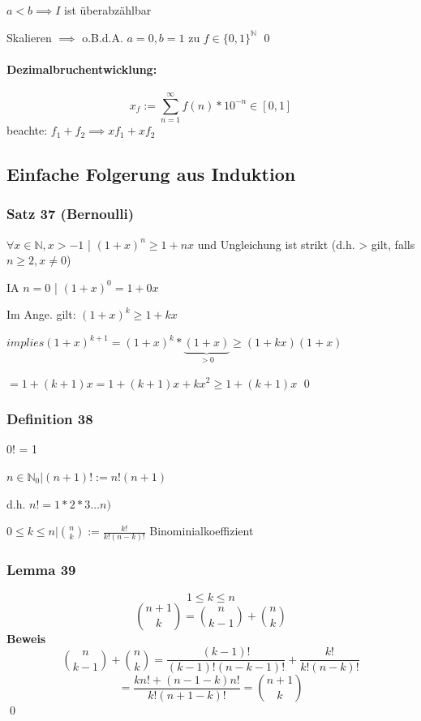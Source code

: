 \documentclass[fleqn]{scrartcl}
\renewenvironment{proof}{{\bfseries Beweis }}{\qed}
\begin{document}
$a < b \implies I$ ist überabzählbar

\begin{proof}
Skalieren $\implies$ o.B.d.A. $a = 0, b = 1$ zu $f \in \{0,1\}^\mathbb{N}$
\end{proof}
\paragraph{Dezimalbruchentwicklung:} \[x_f := \sum_{n = 1}^\infty f(n) * 10^{-n} \in [0,1]\]
beachte: $f_1 + f_2 \implies xf_1 + xf_2$
\subsection{Einfache Folgerung aus Induktion}
\subsubsection{Satz 37 (Bernoulli)}
$\forall x \in \mathbb{N}, x > -1$ | $(1+x)^n \geq 1 + nx$ und Ungleichung ist strikt (d.h. > gilt, falls $n \geq 2, x \neq 0$)

\begin{proof}
	IA $n = 0$ | $(1 + x)^0 = 1 + 0x$
	
	Im Ange. gilt: $(1 + x)^k \geq 1 + k x$
	
	$implies (1 + x)^{k + 1} = (1 + x)^k * \underbrace{(1 + x)}_{> 0} \geq (1 + kx) (1 + x)$
	
	$= 1 + (k + 1)x = 1 + (k + 1)x + k x^2 \geq 1 + (k + 1)x$
\end{proof}
\subsubsection{Definition 38} 0! = 1

	$n \in \mathbb{N}_0 | (n + 1)! := n!(n+1)$
	
	d.h. $n! = 1 * 2 * 3 \ldots n)$
	
	$0 \leq k \leq n | \binom{n}{k} := \frac{k!}{k!(n-k)!}$ Binominialkoeffizient
\subsubsection{Lemma 39} \[1 \leq k \leq n\] \[\binom{n+1}{k} = \binom {n}{k-1} + \binom{n}{k}\]
\begin{proof}
	\[ \binom {n}{k-1} + \binom{n}{k} = \frac{(k-1)!}{(k-1)!(n-k-1)!} + \frac{k!}{k!(n-k)!}\]
	\[ = \frac{kn! + (n -1 -k)n!}{k!(n+1-k)!} = \binom{n+1}{k}\]
\end{proof}
\end{document}
